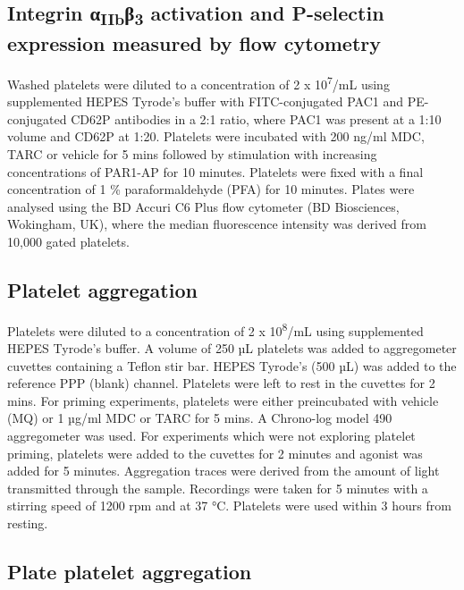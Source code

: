 \documentclass[11pt,twoside]{bristolthesis}
\begin{document}
\hypertarget{integrin-ux3b1iibux3b23-activation-and-p-selectin-expression-measured-by-flow-cytometry-1}{%
\subsection{\texorpdfstring{Integrin α\textsubscript{IIb}β\textsubscript{3} activation and P-selectin expression measured by flow cytometry}{Integrin αIIbβ3 activation and P-selectin expression measured by flow cytometry}}\label{integrin-ux3b1iibux3b23-activation-and-p-selectin-expression-measured-by-flow-cytometry-1}}

Washed platelets were diluted to a concentration of 2 x 10\textsuperscript{7}/mL using supplemented HEPES Tyrode's buffer with FITC-conjugated PAC1 and PE-conjugated CD62P antibodies in a 2:1 ratio, where PAC1 was present at a 1:10 volume and CD62P at 1:20. Platelets were incubated with 200 ng/ml MDC, TARC or vehicle for 5 mins followed by stimulation with increasing concentrations of PAR1-AP for 10 minutes. Platelets were fixed with a final concentration of 1 \% paraformaldehyde (PFA) for 10 minutes. Plates were analysed using the BD Accuri C6 Plus flow cytometer (BD Biosciences, Wokingham, UK), where the median fluorescence intensity was derived from 10,000 gated platelets.

\hypertarget{platelet-aggregation}{%
\subsection{Platelet aggregation}\label{platelet-aggregation}}

Platelets were diluted to a concentration of 2 x 10\textsuperscript{8}/mL using supplemented HEPES Tyrode's buffer. A volume of 250 µL platelets was added to aggregometer cuvettes containing a Teflon stir bar. HEPES Tyrode's (500 µL) was added to the reference PPP (blank) channel. Platelets were left to rest in the cuvettes for 2 mins. For priming experiments, platelets were either preincubated with vehicle (MQ) or 1 µg/ml MDC or TARC for 5 mins. A Chrono-log model 490 aggregometer was used. For experiments which were not exploring platelet priming, platelets were added to the cuvettes for 2 minutes and agonist was added for 5 minutes. Aggregation traces were derived from the amount of light transmitted through the sample. Recordings were taken for 5 minutes with a stirring speed of 1200 rpm and at 37 °C. Platelets were used within 3 hours from resting.

\hypertarget{plate-platelet-aggregation}{%
\subsection{Plate platelet aggregation}\label{plate-platelet-aggregation}}
\end{document}
